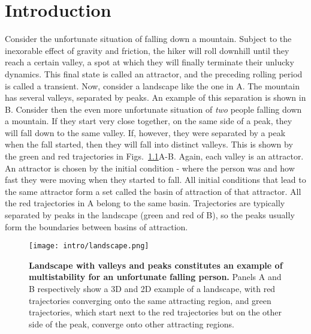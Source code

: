 \chapter{Introduction}
Consider the unfortunate situation of falling down a mountain. Subject to the inexorable effect of gravity and friction, the hiker will roll downhill until they reach a certain valley, a spot at which they will finally terminate their unlucky dynamics. This final state is called an attractor, and the preceding rolling period is called a transient. Now, consider a landscape like the one in A. The mountain has several valleys, separated by peaks. An example of this separation is shown in B. Consider then the even more unfortunate situation of \textit{two} people falling down a mountain. If they start very close together, on the same side of a peak, they will fall down to the same valley. If, however, they were separated by a peak when the fall started, then they will fall into distinct valleys. This is shown by the green and red trajectories in Figs.~\ref{fig:intro:landscape}A-B. Again, each valley is an attractor. An attractor is chosen by the initial condition - where the person was and how fast they were moving when they started to fall. All initial conditions that lead to the same attractor form a set called the basin of attraction of that attractor. All the red trajectories in A belong to the same basin. Trajectories are typically separated by peaks in the landscape (green and red of B), so the peaks usually form the boundaries between basins of attraction.
%
\begin{figure}[htb!]
    \centering
    \texttt{[image: intro/landscape.png]}
    \caption{\textbf{Landscape with valleys and peaks constitutes an example of multistability for an unfortunate falling person.} Panels A and B respectively show a 3D and 2D example of a landscape, with red trajectories converging onto the same attracting region, and green trajectories, which start next to the red trajectories but on the other side of the peak, converge onto other attracting regions.}
    \label{fig:intro:landscape}
\end{figure}


